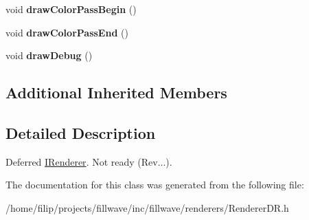 \begin{DoxyCompactItemize}
\item 
\mbox{\label{classflw_1_1flf_1_1RendererDR_a67ecbaeaca15ea841f8e96759fbac89c}} 
void {\bfseries draw\+Color\+Pass\+Begin} ()
\item 
\mbox{\label{classflw_1_1flf_1_1RendererDR_abc5204d63e2309ed1c38c3f6993fc2e4}} 
void {\bfseries draw\+Color\+Pass\+End} ()
\item 
\mbox{\label{classflw_1_1flf_1_1RendererDR_a46901e54f1df38e21564b19eebd2d894}} 
void {\bfseries draw\+Debug} ()
\end{DoxyCompactItemize}
\subsection*{Additional Inherited Members}


\subsection{Detailed Description}
Deferred \hyperlink{classflw_1_1flf_1_1IRenderer}{I\+Renderer}. Not ready (Rev...). 

The documentation for this class was generated from the following file\+:\begin{DoxyCompactItemize}
\item 
/home/filip/projects/fillwave/inc/fillwave/renderers/Renderer\+D\+R.\+h\end{DoxyCompactItemize}
